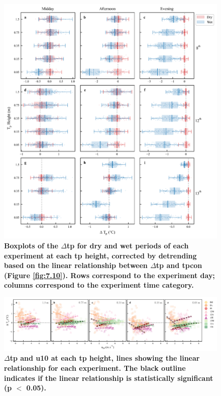 \documentclass[final,3p,times,authoryear]{elsarticle}
\begin{document}
\begin{figure}
\centering
\includegraphics[trim={0 0 0 0},clip,scale=1.0]{pict040.png}
\caption{\bf Boxplots of the $\Delta$\gls{tp} for dry and wet periods of each experiment at each \gls{tp} height, corrected by detrending based on the linear relationship between $\Delta$\gls{tp} and \gls{tpcon} (Figure \ref{fig:7.10}). Rows correspond to the experiment day; columns correspond to the experiment time category.}
 \label{fig:7.11}
\end{figure}



\begin{figure}
\centering
\includegraphics[trim={0 0 0 0},clip,scale=1.0]{pict041.png}
\caption{\bf $\Delta$\gls{tp} and \gls{u10} at each \gls{tp} height, lines showing the linear relationship for each experiment. The black outline indicates if the linear relationship is statistically significant (\gls{p} $<$ 0.05).}
 \label{fig:7.12}
\end{figure}
\end{document}
